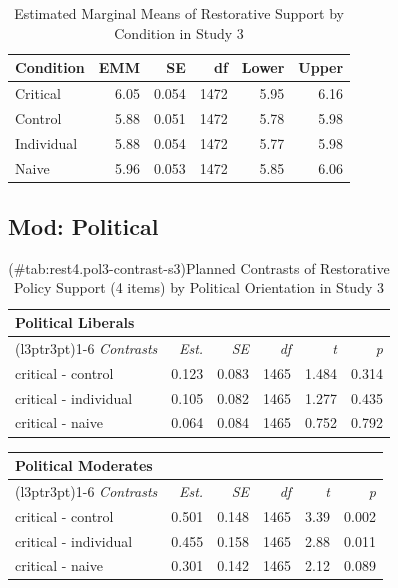 \documentclass[
]{book}
\begin{document}
\begin{table}

\caption{\label{tab:rest4-contrast-s3}Estimated Marginal Means of Restorative Support by Condition in Study 3}
\centering
\begin{tabular}[t]{lrrrrr}
\toprule
Condition & EMM & SE & df & Lower & Upper\\
\midrule
Critical & 6.05 & 0.054 & 1472 & 5.95 & 6.16\\
Control & 5.88 & 0.051 & 1472 & 5.78 & 5.98\\
Individual & 5.88 & 0.054 & 1472 & 5.77 & 5.98\\
Naive & 5.96 & 0.053 & 1472 & 5.85 & 6.06\\
\bottomrule
\end{tabular}
\end{table}

\hypertarget{mod-political-9}{%
\subsection{Mod: Political}\label{mod-political-9}}

\begin{table}

\caption{(\#tab:rest4.pol3-contrast-s3)Planned Contrasts of Restorative Policy Support (4 items) by Political Orientation in Study 3}
\centering
\begin{tabular}[t]{lrrrrr}
\toprule
\multicolumn{6}{l}{Political Liberals} \\
\cmidrule(l{3pt}r{3pt}){1-6}
\em{Contrasts} & \em{Est.} & \em{SE} & \em{df} & \em{t} & \em{p}\\
\midrule
critical - control & 0.123 & 0.083 & 1465 & 1.484 & 0.314\\
critical - individual & 0.105 & 0.082 & 1465 & 1.277 & 0.435\\
critical - naive & 0.064 & 0.084 & 1465 & 0.752 & 0.792\\
\bottomrule
\end{tabular}
\end{table}

\begin{table}
\centering
\fontsize{13}{15}\selectfont
\begin{tabular}{lrrrrr}
\toprule
\multicolumn{6}{l}{Political Moderates} \\
\cmidrule(l{3pt}r{3pt}){1-6}
\em{Contrasts} & \em{Est.} & \em{SE} & \em{df} & \em{t} & \em{p}\\
\midrule
critical - control & 0.501 & 0.148 & 1465 & 3.39 & 0.002\\
critical - individual & 0.455 & 0.158 & 1465 & 2.88 & 0.011\\
critical - naive & 0.301 & 0.142 & 1465 & 2.12 & 0.089\\
\bottomrule
\end{tabular}
\end{table}
\end{document}

